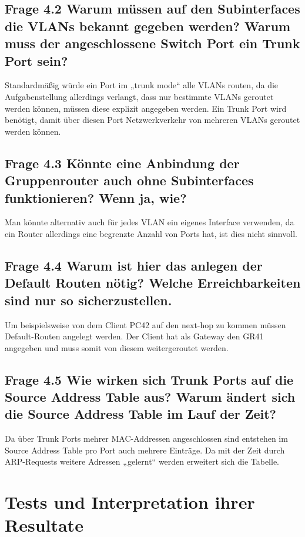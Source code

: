 \documentclass{article}
\begin{document}
\subsection*{Frage 4.2 \normalfont Warum müssen auf den Subinterfaces die VLANs bekannt gegeben werden? Warum muss der angeschlossene Switch Port ein Trunk Port sein?}
Standardmäßig würde ein Port im „trunk mode“ alle VLANs routen, da die Aufgabenstellung allerdings verlangt, dass nur bestimmte VLANs geroutet werden können, müssen diese explizit angegeben werden. Ein Trunk Port wird benötigt, damit über diesen Port Netzwerkverkehr von mehreren VLANs geroutet werden können.

\subsection*{Frage 4.3 \normalfont Könnte eine Anbindung der Gruppenrouter auch ohne Subinterfaces funktionieren? Wenn ja, wie?}
Man könnte alternativ auch für jedes VLAN ein eigenes Interface verwenden, da ein Router allerdings eine begrenzte Anzahl von Ports hat, ist dies nicht sinnvoll.

\subsection*{Frage 4.4 \normalfont Warum ist hier das anlegen der Default Routen nötig? Welche Erreichbarkeiten sind nur so sicherzustellen.}
Um beispielsweise von dem Client PC42 auf den next-hop zu kommen müssen Default-Routen angelegt werden. Der Client hat als Gateway den GR41 angegeben und muss somit von diesem weitergeroutet werden.


\subsection*{Frage 4.5 \normalfont Wie wirken sich Trunk Ports auf die Source Address Table aus? Warum ändert sich die Source Address Table im Lauf der Zeit?}
Da über Trunk Ports mehrer MAC-Addressen angeschlossen sind entstehen im Source Address Table pro Port auch mehrere Einträge. Da mit der Zeit durch ARP-Requests weitere Adressen „gelernt“ werden erweitert sich die Tabelle.

\section{Tests und Interpretation ihrer Resultate}
\end{document}
